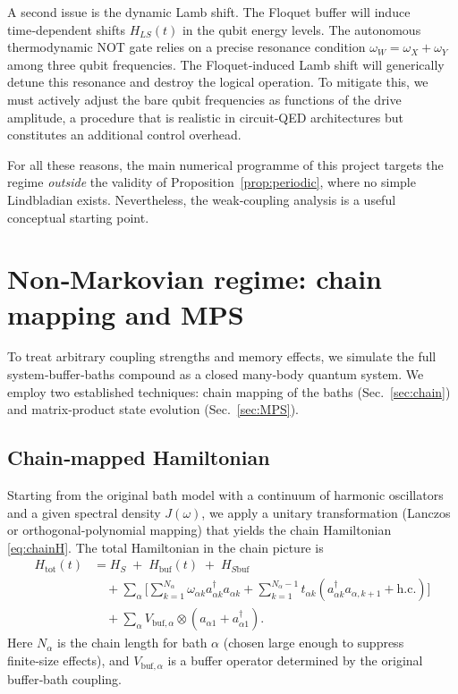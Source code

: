 \documentclass[11pt,a4paper]{article}
\theoremstyle{definition}
\theoremstyle{remark}
\begin{document}
A second issue is the dynamic Lamb shift. The Floquet buffer will induce time‑dependent shifts $H_{LS}(t)$ in the qubit energy levels. The autonomous thermodynamic NOT gate relies on a precise resonance condition $\omega_W = \omega_X + \omega_Y$ among three qubit frequencies. The Floquet‑induced Lamb shift will generically detune this resonance and destroy the logical operation. To mitigate this, we must actively adjust the bare qubit frequencies as functions of the drive amplitude, a procedure that is realistic in circuit‑QED architectures but constitutes an additional control overhead.

For all these reasons, the main numerical programme of this project targets the regime \emph{outside} the validity of Proposition~\ref{prop:periodic}, where no simple Lindbladian exists. Nevertheless, the weak‑coupling analysis is a useful conceptual starting point.

\section{Non‑Markovian regime: chain mapping and MPS}\label{sec:nonMarkovian}
To treat arbitrary coupling strengths and memory effects, we simulate the full system‑buffer‑baths compound as a closed many‑body quantum system. We employ two established techniques: chain mapping of the baths (Sec.~\ref{sec:chain}) and matrix‑product state evolution (Sec.~\ref{sec:MPS}).

\subsection{Chain‑mapped Hamiltonian}
Starting from the original bath model with a continuum of harmonic oscillators and a given spectral density $J(\omega)$, we apply a unitary transformation (Lanczos or orthogonal‑polynomial mapping) that yields the chain Hamiltonian \eqref{eq:chainH}. The total Hamiltonian in the chain picture is
\begin{equation}\label{eq:total_chain}
\begin{aligned}
H_{\text{tot}}(t) &= H_S \;+\; H_{\text{buf}}(t) \;+\; H_{S\text{buf}} \\
&\quad + \sum_{\alpha} \Big[ \sum_{k=1}^{N_\alpha} \omega_{\alpha k} a_{\alpha k}^\dagger a_{\alpha k}
   + \sum_{k=1}^{N_\alpha-1} t_{\alpha k} (a_{\alpha k}^\dagger a_{\alpha,k+1} + \text{h.c.}) \Big] \\
&\quad + \sum_{\alpha} V_{\text{buf},\alpha} \otimes (a_{\alpha 1} + a_{\alpha 1}^\dagger).
\end{aligned}
\end{equation}
Here $N_\alpha$ is the chain length for bath $\alpha$ (chosen large enough to suppress finite‑size effects), and $V_{\text{buf},\alpha}$ is a buffer operator determined by the original buffer‑bath coupling.
\end{document}
